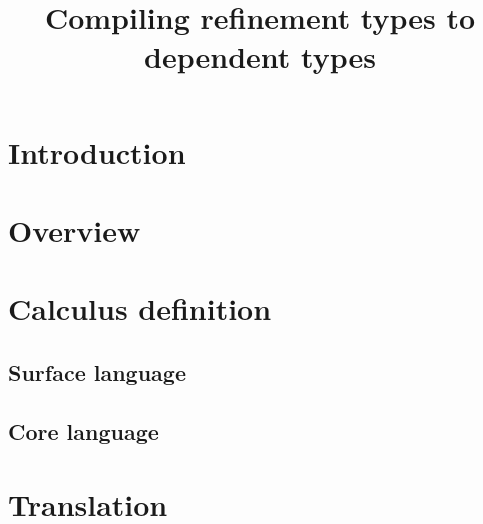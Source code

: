 \documentclass[12pt,a4paper]{article}
\title{Compiling refinement types to dependent types}
\begin{document}
\maketitle

\section{Introduction}

\section{Overview}

\section{Calculus definition}

\subsection{Surface language}

\subsection{Core language}

\section{Translation}
\end{document}

